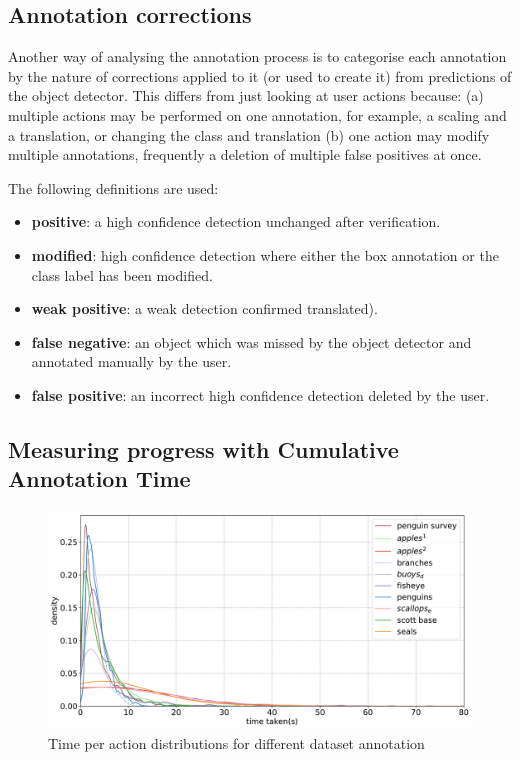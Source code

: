 \subsection{Annotation corrections}
\label{sec:corrections}

Another way of analysing the annotation process is to categorise each annotation by the nature of corrections applied to it (or used to create it) from predictions of the object detector. This differs from just looking at user actions because: (a) multiple actions may be performed on one annotation, for example, a scaling and a translation, or changing the class and translation (b) one action may modify multiple annotations, frequently a deletion of multiple false positives at once.

The following definitions are used:

\begin{itemize}
    \item {\bf positive}: a high confidence detection unchanged after verification.
    \item {\bf modified}: high confidence detection where either the box annotation or the class label has been modified.
    \item {\bf weak positive}: a weak detection confirmed translated).    
    \item {\bf false negative}: an object which was missed by the object detector and annotated manually by the user.    
    \item {\bf false positive}: an incorrect high confidence detection deleted by the user.
\end{itemize}

\subsection{Measuring progress with Cumulative Annotation Time}
\label{sec:ann_time}

\begin{figure}
\centering
  \includegraphics[width=1.0\linewidth]{charts/summaries/time_density.pdf}
  \caption{Time per action distributions for different dataset annotation}
  \label{fig:annotation_time_density}
\end{figure}

